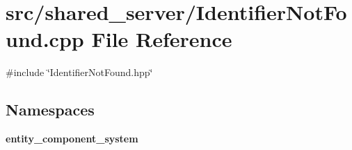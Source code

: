 \section{src/shared\+\_\+server/\+Identifier\+Not\+Found.cpp File Reference}
\label{server_2_identifier_not_found_8cpp}
{\ttfamily \#include \char`\"{}Identifier\+Not\+Found.\+hpp\char`\"{}}\newline
\subsection*{Namespaces}
\begin{DoxyCompactItemize}
\item 
 {\bf entity\+\_\+component\+\_\+system}
\end{DoxyCompactItemize}

